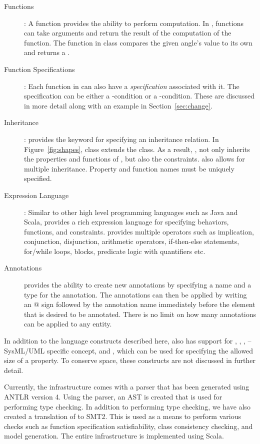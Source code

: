\begin{description}
\item [Functions]: A function provides the ability to perform
  computation. In \Klang{}, functions can take arguments and return
  the result of the computation of the function. The 
  function in class  compares the given angle's value to
  its own and returns a .

\item [Function Specifications]: Each function in \Klang{} can also
  have a \emph{specification} associated with it. The specification
  can be either a -condition or a
  -condition. These are discussed in more detail along with
  an example in Section~\ref{sec:change}.
  
\item [Inheritance]: \Klang{} provides the  keyword for
  specifying an inheritance relation. In Figure~\ref{fig:shapes},
   class extends the  class. As a result,
  , not only inherits the properties and functions of
  , but also the constraints. \Klang{} also allows for
  multiple inheritance. Property and function names must be uniquely
  specified.

\item [Expression Language]: Similar to other high level programming
  languages such as Java and Scala, \Klang{} provides a rich
  expression language for specifying behaviors, functions, and
  constraints. \Klang{} provides multiple operators such as
  implication, conjunction, disjunction, arithmetic operators,
  if-then-else statements, for/while loops, blocks, predicate logic
  with quantifiers etc. 

\item [Annotations] \Klang{} provides the ability to create new
  annotations by specifying a name and a type for the annotation. The
  annotations can then be applied by writing an $@$ sign followed by
  the annotation name immediately before the element that is desired
  to be annotated. There is no limit on how many annotations can be
  applied to any entity. 

\end{description}

In addition to the language constructs described here, \Klang{} also
has support for , , ,
 -- SysML/UML specific concept, and
, which can be used for specifying the allowed
size of a property. To conserve space, these constructs are not
discussed in further detail.

Currently, the \Klang{} infrastructure comes with a parser that has
been generated using ANTLR version 4. Using the parser, an AST is
created that is used for performing type checking. In addition to
performing type checking, we have also created a translation of
\Klang{} to SMT2. This is used as a means to perform various checks
such as function specification satisfiability, class consistency
checking, and model generation. The entire \Klang{} infrastructure is
implemented using Scala.

 
